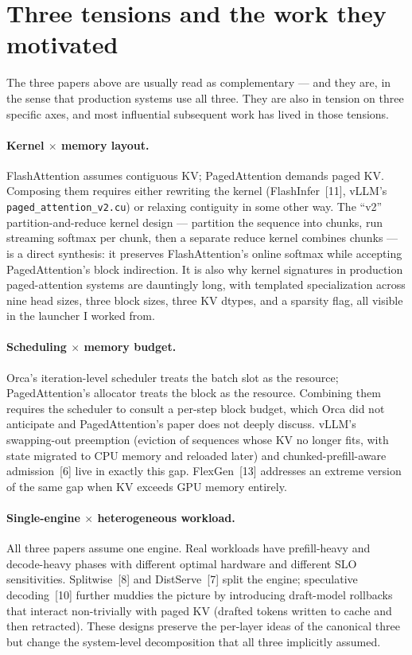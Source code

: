 \documentclass{article}
\begin{document}
\section{Three tensions and the work they motivated}

The three papers above are usually read as complementary --- and they are, in the sense that production systems use all three. They are also in tension on three specific axes, and most influential subsequent work has lived in those tensions.

\paragraph{Kernel $\times$ memory layout.} FlashAttention assumes contiguous KV; PagedAttention demands paged KV. Composing them requires either rewriting the kernel (FlashInfer~[11], vLLM's \texttt{paged\_attention\_v2.cu}) or relaxing contiguity in some other way. The ``v2'' partition-and-reduce kernel design --- partition the sequence into chunks, run streaming softmax per chunk, then a separate reduce kernel combines chunks --- is a direct synthesis: it preserves FlashAttention's online softmax while accepting PagedAttention's block indirection. It is also why kernel signatures in production paged-attention systems are dauntingly long, with templated specialization across nine head sizes, three block sizes, three KV dtypes, and a sparsity flag, all visible in the launcher I worked from.

\paragraph{Scheduling $\times$ memory budget.} Orca's iteration-level scheduler treats the batch slot as the resource; PagedAttention's allocator treats the block as the resource. Combining them requires the scheduler to consult a per-step block budget, which Orca did not anticipate and PagedAttention's paper does not deeply discuss. vLLM's swapping-out preemption (eviction of sequences whose KV no longer fits, with state migrated to CPU memory and reloaded later) and chunked-prefill-aware admission~[6] live in exactly this gap. FlexGen~[13] addresses an extreme version of the same gap when KV exceeds GPU memory entirely.

\paragraph{Single-engine $\times$ heterogeneous workload.} All three papers assume one engine. Real workloads have prefill-heavy and decode-heavy phases with different optimal hardware and different SLO sensitivities. Splitwise~[8] and DistServe~[7] split the engine; speculative decoding~[10] further muddies the picture by introducing draft-model rollbacks that interact non-trivially with paged KV (drafted tokens written to cache and then retracted). These designs preserve the per-layer ideas of the canonical three but change the system-level decomposition that all three implicitly assumed.
\end{document}
